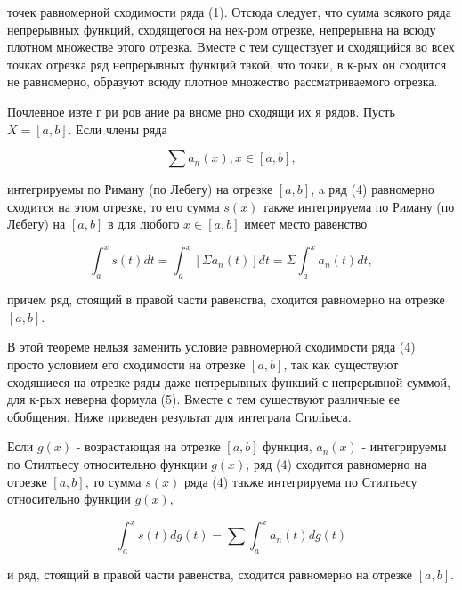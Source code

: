 \documentclass[10pt]{article}
\begin{document}
точек равномерной сходимости ряда (1). Отсюда следует, что сумма всякого ряда непрерывных функций, сходящегося на нек-ром отрезке, непрерывна на всюду плотном множестве этого отрезка. Вместе с тем существует и сходящийся во всех точках отрезка ряд непрерывных функций такой, что точки, в к-рых он сходится не равномерно, образуют всюду плотное множество рассматриваемого отрезка.



Почлевное ивте г ри ров ание ра вноме рно сходящи их я рядов. Пусть $X=[a, b]$. Если члены ряда



\[

\sum a_{n}(x), x \in[a, b],

\]



интегрируемы по Риману (по Лебегу) на отрезке $[a, b]$, a ряд (4) равномерно сходится на этом отрезке, то его сумма $s(x)$ также интегрируема по Риману (по Лебегу) на $[a, b]$ в для любого $x \in[a, b]$ имеет место равенство



\[

\int_{a}^{x} s(t) d t=\int_{a}^{x}\left[\Sigma a_{n}(t)\right] d t=\Sigma \int_{a}^{x} a_{n}(t) d t,

\]



причем ряд, стоящий в правой части равенства, сходится равномерно на отрезке $[a, b]$.



В этой теореме нельзя заменить условие равномерной сходимости ряда (4) просто условием его сходимости на отрезке $[a, b]$, так как существуют сходящиеся на отрезке ряды даже непрерывных функций с непрерывной суммой, для к-рых неверна формула (5). Вместе с тем существуют различные ее обобщения. Ниже приведен результат для интеграла Стиліьеса.



Если $g(x)$ - возрастающая на отрезке $[a, b]$ функция, $a_{n}(x)$ - интегрируемы по Стилтьесу относительно функции $g(x)$, ряд (4) сходится равномерно на отрезке $[a, b]$, то сумма $s(x)$ ряда (4) также интегрируема по Стилтьесу относительно функции $g(x)$,



\[

\int_{a}^{x} s(t) d g(t)=\sum \int_{a}^{x} a_{n}(t) d g(t)

\]



и ряд, стоящий в правой части равенства, сходится равномерно на отрезке $[a, b]$.
\end{document}
